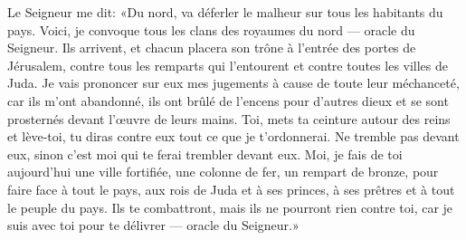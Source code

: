 Le Seigneur me dit:
	«Du nord, va déferler le malheur sur tous les habitants du pays.
Voici, je convoque tous les clans des royaumes du nord --- oracle du Seigneur.
Ils arrivent, et chacun placera son trône à l’entrée des portes de Jérusalem,
	contre tous les remparts qui l’entourent
	et contre toutes les villes de Juda.
Je vais prononcer sur eux mes jugements à cause de toute leur méchanceté,
	car ils m’ont abandonné, ils ont brûlé de l’encens pour d’autres dieux
	et se sont prosternés devant l’œuvre de leurs mains.
Toi, mets ta ceinture autour des reins et lève-toi,
	tu diras contre eux tout ce que je t’ordonnerai.
Ne tremble pas devant eux, sinon c’est moi qui te ferai trembler devant eux.
Moi, je fais de toi aujourd’hui une ville fortifiée,
	une colonne de fer, un rempart de bronze,
	pour faire face à tout le pays,
	aux rois de Juda et à ses princes,
	à ses prêtres et à tout le peuple du pays.
Ils te combattront, mais ils ne pourront rien contre toi,
	car je suis avec toi pour te délivrer --- oracle du Seigneur.»
